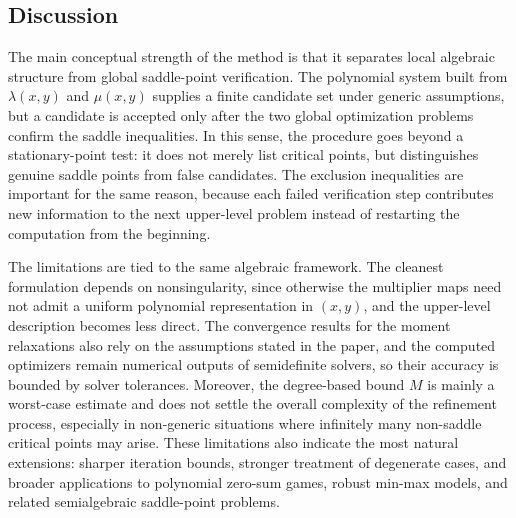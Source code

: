 \documentclass[11pt]{article}
\begin{document}
\subsection{Discussion}
The main conceptual strength of the method is that it separates local algebraic structure from global
saddle-point verification. The polynomial system built from $\lambda(x,y)$ and $\mu(x,y)$ supplies a
finite candidate set under generic assumptions, but a candidate is accepted only after the two
global optimization problems confirm the saddle inequalities. In this sense, the procedure goes
beyond a stationary-point test: it does not merely list critical points, but distinguishes genuine
saddle points from false candidates. The exclusion inequalities are important for the same reason,
because each failed verification step contributes new information to the next upper-level problem
instead of restarting the computation from the beginning.

The limitations are tied to the same algebraic framework. The cleanest formulation depends on
nonsingularity, since otherwise the multiplier maps need not admit a uniform polynomial
representation in $(x,y)$, and the upper-level description becomes less direct. The convergence
results for the moment relaxations also rely on the assumptions stated in the paper, and the
computed optimizers remain numerical outputs of semidefinite solvers, so their accuracy is bounded
by solver tolerances. Moreover, the degree-based bound $M$ is mainly a worst-case estimate and does
not settle the overall complexity of the refinement process, especially in non-generic situations
where infinitely many non-saddle critical points may arise. These limitations also indicate the most
natural extensions: sharper iteration bounds, stronger treatment of degenerate cases, and broader
applications to polynomial zero-sum games, robust min-max models, and related semialgebraic
saddle-point problems.
\end{document}
